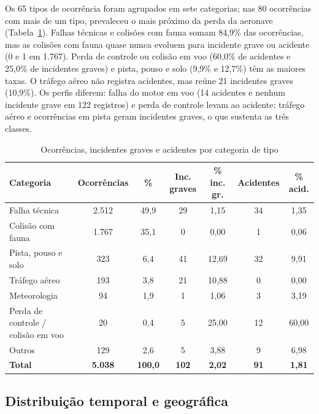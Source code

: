 \documentclass[12pt]{article}
\begin{document}
Os 65 tipos de ocorrência foram agrupados em sete categorias; nas 80 ocorrências com mais de um tipo, prevaleceu o mais próximo da perda da aeronave (Tabela~\ref{tab:tipos_ocorrencia}). Falhas técnicas e colisões com fauna somam 84,9\% das ocorrências, mas as colisões com fauna quase nunca evoluem para incidente grave ou acidente (0 e 1 em 1.767). Perda de controle ou colisão em voo (60,0\% de acidentes e 25,0\% de incidentes graves) e pista, pouso e solo (9,9\% e 12,7\%) têm as maiores taxas. O tráfego aéreo não registra acidentes, mas reúne 21 incidentes graves (10,9\%). Os perfis diferem: falha do motor em voo (14 acidentes e nenhum incidente grave em 122 registros) e perda de controle levam ao acidente; tráfego aéreo e ocorrências em pista geram incidentes graves, o que sustenta as três classes.

\begin{table}[htbp]
    \centering
    \caption{Ocorrências, incidentes graves e acidentes por categoria de tipo}
    \vspace{0.05cm}
    \footnotesize\setlength{\tabcolsep}{3pt}\renewcommand{\arraystretch}{0.88}
    \begin{tabular}{lcccccc}
\toprule
\textbf{Categoria} & \textbf{Ocorrências} & \textbf{\%} & \textbf{Inc. graves} & \textbf{\% inc. gr.} & \textbf{Acidentes} & \textbf{\% acid.} \\
\midrule
Falha técnica & 2.512 & 49,9 & 29 & 1,15 & 34 & 1,35 \\
Colisão com fauna & 1.767 & 35,1 & 0 & 0,00 & 1 & 0,06 \\
Pista, pouso e solo & 323 & 6,4 & 41 & 12,69 & 32 & 9,91 \\
Tráfego aéreo & 193 & 3,8 & 21 & 10,88 & 0 & 0,00 \\
Meteorologia & 94 & 1,9 & 1 & 1,06 & 3 & 3,19 \\
Perda de controle / colisão em voo & 20 & 0,4 & 5 & 25,00 & 12 & 60,00 \\
Outros & 129 & 2,6 & 5 & 3,88 & 9 & 6,98 \\
\midrule
\textbf{Total} & \textbf{5.038} & \textbf{100,0} & \textbf{102} & \textbf{2,02} & \textbf{91} & \textbf{1,81} \\
\bottomrule
\end{tabular}
    \label{tab:tipos_ocorrencia}
\end{table}

\subsection{Distribuição temporal e geográfica}
\label{sec:temporal}
\end{document}

